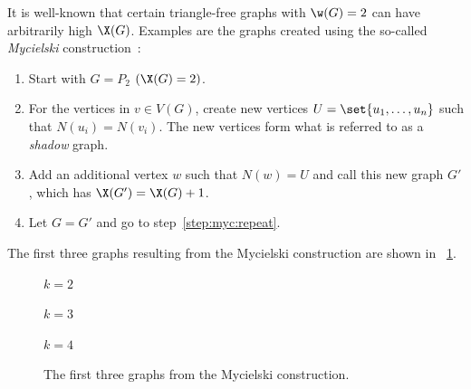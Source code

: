 It is well-known that certain triangle-free graphs with \(\w(G)=2\) can have arbitrarily high \(\X(G)\).  Examples
are the graphs created using the so-called \emph{Mycielski} construction~\cite{west}:
\begin{enumerate}
\item Start with \(G=P_2\) \((\X(G)=2)\).
\item\label{step:myc:repeat} For the vertices in \(v\in V(G)\), create new vertices \(U=\set{u_1,\ldots,u_n}\) such
  that \(N(u_i)=N(v_i)\).  The new vertices form what is referred to as a \emph{shadow} graph.
\item Add an additional vertex \(w\) such that \(N(w)=U\) and call this new graph \(G'\), which has
  \(\X(G')=\X(G)+1\).
\item Let \(G=G'\) and go to step~\ref{step:myc:repeat}.
\end{enumerate}

The first three graphs resulting from the Mycielski construction are shown in \figurename~\ref{fig:mycielski}.

\begin{figure}[H]
  \begin{minipage}{1in}
    \centering

    \(k=2\)
  \end{minipage}
  \begin{minipage}{2in}
    \centering

    \(k=3\)
  \end{minipage}
  \begin{minipage}{2.75in}
    \centering

    \(k=4\)
  \end{minipage}
  \caption{The first three graphs from the Mycielski construction.}
  \label{fig:mycielski}
\end{figure}

